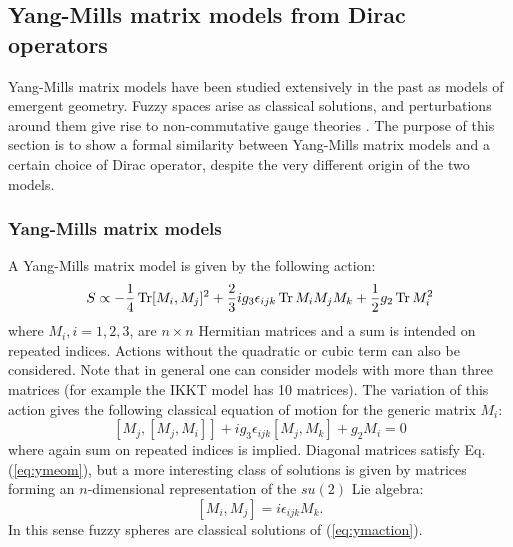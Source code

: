 \subsection{Yang-Mills matrix models from Dirac operators}
Yang-Mills matrix models have been studied extensively in the past \cite{ymnum1} \cite{ymnum2} \cite{ymnum3} \cite{ymnum4} as models of emergent geometry. Fuzzy spaces arise as classical solutions, and perturbations around them give rise to non-commutative gauge theories \cite{hareview}.\newline
The purpose of this section is to show a formal similarity between Yang-Mills matrix models and a certain choice of Dirac operator, despite the very different origin of the two models.\newline

\subsubsection{Yang-Mills matrix models}
A Yang-Mills matrix model is given by the following action:
\begin{equation}\label{eq:ymaction}
S \propto -\frac{1}{4} \operatorname{Tr} [M_i, M_j]^2 + \frac{2}{3} i g_3 \epsilon_{ijk} \operatorname{Tr} M_i M_j M_k + \frac{1}{2} g_2 \operatorname{Tr} M_i^2
\end{equation}
where $M_i, i=1,2,3$, are $n \times n$ Hermitian matrices and a sum is intended on repeated indices. Actions without the quadratic or cubic term can also be considered. Note that in general one can consider models with more than three matrices (for example the IKKT model \cite{ikkt} has 10 matrices).\newline
The variation of this action gives the following classical equation of motion for the generic matrix $M_i$:
\begin{equation}\label{eq:ymeom}
[M_j, [M_j, M_i]] + i g_3 \epsilon_{ijk}[M_j, M_k] + g_2 M_i = 0
\end{equation}
where again sum on repeated indices is implied. Diagonal matrices satisfy Eq.(\ref{eq:ymeom}), but a more interesting class of solutions is given by matrices forming an $n$-dimensional representation of the $su(2)$ Lie algebra:
\begin{equation}\label{eq:ymsol}
[M_i, M_j] = i \epsilon_{ijk} M_k.
\end{equation}
In this sense fuzzy spheres are classical solutions of (\ref{eq:ymaction}).

